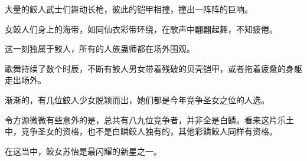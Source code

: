 \begin{this_body}
大量的鲛人武士们舞动长枪，彼此的铠甲相撞，撞出一阵阵的巨响。

女鲛人们身上的海带，如同仙衣彩带环绕，在歌声中翩翩起舞，不知疲倦。

这一刻独属于鲛人，所有的人族蛊师都在场外围观。

歌舞持续了数个时辰，不断有鲛人男女带着残破的贝壳铠甲，或者拖着疲惫的身躯走出场外。

渐渐的，有几位鲛人少女脱颖而出，她们都是今年竞争圣女之位的人选。

令方源微微有些意外的是，总共有八九位竞争者，并非全是白鳞。看来这片乐土中，竞争圣女的资格，也不是白鳞鲛人独有的，其他彩鳞鲛人同样有资格。

在这当中，鲛女苏怡是最闪耀的新星之一。

\end{this_body}

